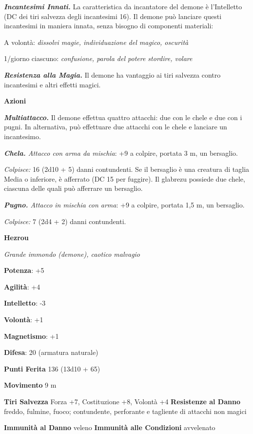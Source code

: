 \begin{multicols}{2}
\emph{\textbf{Incantesimi Innati.}} La caratteristica da incantatore del
demone è l'Intelletto (DC dei tiri salvezza degli incantesimi 16). Il
demone può lanciare questi incantesimi in maniera innata, senza bisogno
di componenti materiali:

A volontà: \emph{dissolvi magie, individuazione del magico, oscurità}

1/giorno ciascuno: \emph{confusione, parola del potere stordire, volare}

\emph{\textbf{Resistenza alla Magia.}} Il demone ha vantaggio ai tiri
salvezza contro incantesimi e altri effetti magici.

\textbf{Azioni}

\emph{\textbf{Multiattacco.}} Il demone effettua quattro attacchi: due
con le chele e due con i pugni. In alternativa, può effettuare due
attacchi con le chele e lanciare un incantesimo.

\emph{\textbf{Chela.} Attacco con arma da mischia}: +9 a colpire,
portata 3 m, un bersaglio.

\emph{Colpisce:} 16 (2d10 + 5) danni contundenti. Se il bersaglio è una
creatura di taglia Media o inferiore, è afferrato (DC 15 per fuggire).
Il glabrezu possiede due chele, ciascuna delle quali può afferrare un
bersaglio.

\emph{\textbf{Pugno.} Attacco in mischia con arma}: +9 a colpire,
portata 1,5 m, un bersaglio.

\emph{Colpisce:} 7 (2d4 + 2) danni contundenti.

\textbf{Hezrou}

\emph{Grande immondo (demone), caotico malvagio}

\textbf{Potenza}: +5

\textbf{Agilità}: +4

\textbf{Intelletto}: -3

\textbf{Volontà}: +1

\textbf{Magnetismo}: +1

\textbf{Difesa}: 20 (armatura naturale)

\textbf{Punti Ferita} 136 (13d10 + 65)

\textbf{Movimento} 9 m

\textbf{Tiri Salvezza} Forza +7, Costituzione +8, Volontà +4
\textbf{Resistenze al Danno} freddo, fulmine, fuoco; contundente,
perforante e tagliente di attacchi non magici

\textbf{Immunità al Danno} veleno \textbf{Immunità alle Condizioni}
avvelenato


\end{multicols}
